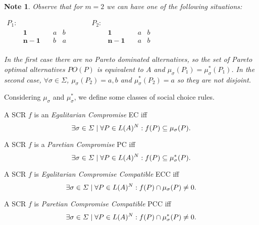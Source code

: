 \documentclass[version=3.21, pagesize, notitlepage, twoside=off, bibliography=totoc, DIV=calc, fontsize=12pt, a4paper]{scrartcl}
\newtheorem*{note}{Note}
\newcommand{\paretopt}{\mathit{PO}}
\newcommand{\musigma}{\mu_{\sigma}}
\newcommand{\mustar}{\mu_{\sigma}^*}
\begin{document}
\begin{note}
	Observe that for $m=2$ we can have one of the following situations:
	\begin{center}
		$
		\begin{array}{ccccccccc}
		P_1:&&&&&P_2:&&&\\ 
		&\mathbf{1} \quad &a&b&  \qquad &&\mathbf{1} \quad &a&b\\
		&\mathbf{n-1} \quad &b&a& \qquad &&\mathbf{n-1} \quad &a&b\\
		\end{array}
		$
	\end{center}
	In the first case there are no Pareto dominated alternatives, so the set of Pareto optimal alternatives $\paretopt(P)$ is equivalent to $A$ and $\musigma(P_1)=\mustar(P_1)$. In the second case, $\forall \sigma \in \Sigma$, $\musigma(P_2)={a,b}$ and $\mustar(P_2)={a}$ so they are not disjoint.
\end{note}

\pagebreak

Considering $\musigma$ and $\mustar$, we define some classes of social choice rules.
\begin{definition} A SCR $f$ is an \textit{Egalitarian Compromise} EC iff \[\exists \sigma \in \Sigma \suchthat \forall P \in L(A)^N: f(P) \subseteq \musigma(P).\]
\end{definition}

\begin{definition} A SCR $f$ is a \textit{Paretian Compromise} PC iff \[\exists \sigma \in \Sigma \suchthat \forall P \in L(A)^N: f(P) \subseteq \mustar(P).\]
\end{definition}

\begin{definition} A SCR $f$ is \textit{Egalitarian Compromise Compatible} ECC iff \[\exists \sigma \in \Sigma \suchthat \forall P \in L(A)^N: f(P) \cap \musigma(P) \neq 0.\]
\end{definition}

\begin{definition} A SCR $f$ is \textit{Paretian Compromise Compatible} PCC iff \[\exists \sigma \in \Sigma \suchthat \forall P \in L(A)^N: f(P) \cap \mustar(P) \neq 0.\]
\end{definition}
\end{document}
